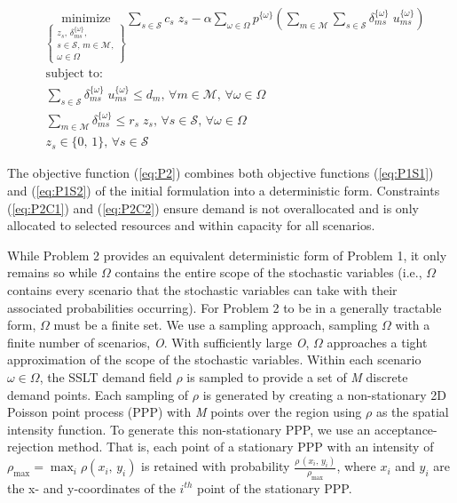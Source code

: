 \documentclass[onecolumn,draftcls]{IEEEtran}
\begin{document}
\vspace{5mm}
\begin{tcolorbox}[title = Problem 2 (Deterministic Equivalent Program of Problem 1)]
\begin{align}
& 
\underset{\left\{ \substack{
	z_s,\, \delta_{ms}^{\{\omega\}},\\
	s \in \mathcal{S},\, m \in \mathcal{M},\\
	\omega \in \Omega} \right\}} {\text{minimize}}
\sum_{s \in \mathcal{S}} c_s \; z_s - \alpha \sum_{\omega \in \Omega} p^{\{\omega\}} \left( \sum_{m \in \mathcal{M}} \sum_{s \in \mathcal{S}} \delta_{ms}^{\{\omega\}} \; u_{ms}^{\{\omega\}} \right) \label{eq:P2}\\
& \text{subject to:}  \nonumber \\
& \sum_{s \in \mathcal{S}} \delta_{ms}^{\{\omega\}} \; u_{ms}^{\{\omega\}} \leq d_m,\, \forall m \in \mathcal{M},\, \forall \omega \in \Omega \label{eq:P2C1}\\
& \sum_{m \in \mathcal{M}} \delta_{ms}^{\{\omega\}} \leq r_s \; z_s,\, \forall s \in \mathcal{S},\, \forall \omega \in \Omega \label{eq:P2C2}\\
& z_s \in \{0,\, 1\},\, \forall s \in \mathcal{S} \label{eq:P2C3}
\end{align}
\end{tcolorbox}

The objective function (\ref{eq:P2}) combines both objective functions (\ref{eq:P1S1}) and (\ref{eq:P1S2}) of the initial formulation into a deterministic form.  Constraints (\ref{eq:P2C1}) and (\ref{eq:P2C2})	ensure demand is not overallocated and is only allocated to selected resources and within capacity for all scenarios.

While Problem 2 provides an equivalent deterministic form of Problem 1, it only remains so while $\Omega$ contains the entire scope of the stochastic variables (i.e., $\Omega$ contains every scenario that the stochastic variables can take with their associated probabilities occurring).  For Problem 2 to be in a generally tractable form, $\Omega$ must be a finite set.  We use a sampling approach, sampling $\Omega$ with a finite number of scenarios, \textit{O}.  With sufficiently large \textit{O}, $\Omega$ approaches a tight approximation of the scope of the stochastic variables.  Within each scenario $\omega \in \Omega$, the SSLT demand field $\rho$ is sampled to provide a set of \textit{M} discrete demand points.  Each sampling of $\rho$ is generated by creating a non-stationary 2D Poisson point process (PPP) with \textit{M} points over the region using $\rho$ as the spatial intensity function.  To generate this non-stationary PPP, we use an acceptance-rejection method.  That is, each point of a stationary PPP with an intensity of $\rho_{\max} = \max_i\rho\left(x_i,\, y_i\right)$ is retained with probability $\frac{\rho\,\left(x_i,\, y_i\right)}{\rho_{\max}}$, where $x_i$ and $y_i$ are the x- and y-coordinates of the $i^{th}$ point of the stationary PPP.
\end{document}
